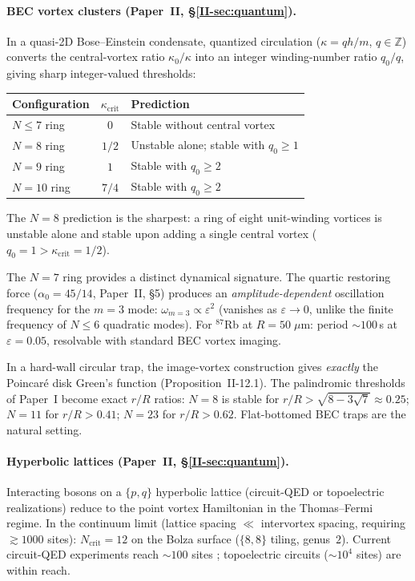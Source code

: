 \paragraph{BEC vortex clusters (Paper~II, \S\ref*{II-sec:quantum}).}
In a quasi-2D Bose--Einstein condensate, quantized
circulation ($\kappa = qh/m$, $q \in \mathbb{Z}$)
converts the central-vortex ratio $\kappa_0/\kappa$ into
an integer winding-number ratio $q_0/q$, giving
sharp integer-valued thresholds:
\begin{center}\small
\begin{tabular}{lcl}
\toprule
Configuration & $\kappa_{\mathrm{crit}}$ & Prediction \\
\midrule
$N \le 7$ ring & $0$ & Stable without central vortex \\
$N = 8$ ring & $1/2$ & Unstable alone; stable with $q_0 \ge 1$ \\
$N = 9$ ring & $1$ & Stable with $q_0 \ge 2$ \\
$N = 10$ ring & $7/4$ & Stable with $q_0 \ge 2$ \\
\bottomrule
\end{tabular}
\end{center}
\noindent
The $N = 8$ prediction is the sharpest:
a ring of eight unit-winding vortices is unstable alone
and stable upon adding a single central vortex
($q_0 = 1 > \kappa_{\mathrm{crit}} = 1/2$).

The $N = 7$ ring provides a distinct dynamical signature.
The quartic restoring force ($\alpha_0 = 45/14$,
Paper~II, \S5) produces an
\emph{amplitude-dependent} oscillation frequency for the
$m = 3$ mode: $\omega_{m=3} \propto \varepsilon^2$
(vanishes as $\varepsilon \to 0$, unlike the finite
frequency of $N \le 6$ quadratic modes).
For $^{87}$Rb at $R = 50\;\mu\mathrm{m}$:
period $\sim\!100$\,s at $\varepsilon = 0.05$,
resolvable with standard BEC vortex imaging.

In a hard-wall circular trap, the image-vortex construction
gives \emph{exactly} the Poincar\'e disk Green's function
(Proposition~II-12.1).
The palindromic thresholds of Paper~I become exact
$r/R$ ratios: $N = 8$ is stable for
$r/R > \sqrt{8{-}3\sqrt{7}} \approx 0.25$;
$N = 11$ for $r/R > 0.41$; $N = 23$ for $r/R > 0.62$.
Flat-bottomed BEC traps \citep{Gauthier2019} are the
natural setting.

\paragraph{Hyperbolic lattices
  (Paper~II, \S\ref*{II-sec:quantum}).}
Interacting bosons on a $\{p,q\}$ hyperbolic lattice
(circuit-QED or topoelectric realizations) reduce to the
point vortex Hamiltonian in the Thomas--Fermi regime.
In the continuum limit (lattice spacing $\ll$ intervortex
spacing, requiring $\gtrsim\!1000$ sites):
$N_{\mathrm{crit}} = 12$ on the Bolza surface
($\{8,8\}$ tiling, genus~$2$).
Current circuit-QED experiments reach $\sim\!100$ sites
\citep{Kollar2019}; topoelectric circuits ($\sim\!10^4$
sites) are within reach.

